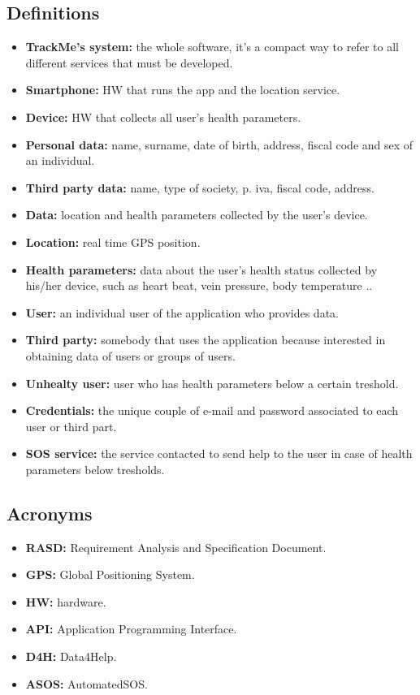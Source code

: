 \subsection{Definitions}
	\begin{itemize}
		\item{\textbf{TrackMe's system:} the whole software, it's a compact way to refer to all different services that must be 					developed.}

		\item {\textbf{Smartphone:} HW that runs the app and the location service.}
		\item {\textbf{Device:} HW that collects all user's health parameters.}

		\item {\textbf{Personal data:} name, surname, date of birth, address, fiscal code and sex of an individual.}
		\item {\textbf{Third party data:} name, type of society, p. iva, fiscal code, address.}
		\item {\textbf{Data:} location and health parameters collected by the user's device.}
		\item {\textbf{Location:} real time GPS position.}
		\item {\textbf{Health parameters:} data about the user's health status collected by his/her device, such as heart beat, 						vein pressure, body temperature ..}

		\item {\textbf{User:} an individual user of the application who provides data.}
		\item {\textbf{Third party:} somebody that uses the application because interested in obtaining data of users or groups of users.} 
		\item {\textbf{Unhealty user:} user who has health parameters below a certain treshold.}
		\item {\textbf{Credentials:} the unique couple of e-mail and password associated to each user or third part.}

		\item{\textbf{SOS service:} the service contacted to send help to the user in case of health parameters below tresholds.}
	\end {itemize}

\subsection{Acronyms}
	\begin{itemize}
		\item {\textbf {RASD:} Requirement Analysis and Specification Document.}
		\item {\textbf {GPS:} Global Positioning System.}
		\item {\textbf {HW:} hardware.}
		\item {\textbf {API:} Application Programming Interface.}
		\item {\textbf {D4H:} Data4Help.} 
		\item {\textbf {ASOS:} AutomatedSOS.}
	\end{itemize}


